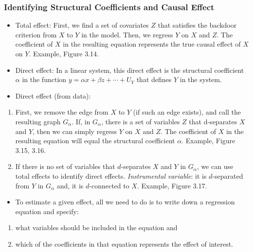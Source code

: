 \documentclass[]{article}
\providecommand{\tightlist}{%
  \setlength{\itemsep}{0pt}\setlength{\parskip}{0pt}}
\begin{document}
\subsubsection{Identifying Structural Coefficients and Causal
Effect}\label{identifying-structural-coefficients-and-causal-effect}

\begin{itemize}
\item
  Total effect: First, we find a set of covariates \(Z\) that satisfies
  the backdoor criterion from \(X\) to \(Y\) in the model. Then, we
  regress \(Y\) on \(X\) and \(Z\). The coefficient of \(X\) in the
  resulting equation represents the true causal effect of \(X\) on
  \(Y\). Example, Figure 3.14.
\item
  Direct effect: In a linear system, this direct effect is the
  structural coefficient \(\alpha\) in the function
  \(y = \alpha x + \beta z + \cdots + U_Y\) that defines \(Y\) in the
  system.
\item
  Direct effect (from data):
\end{itemize}

\begin{enumerate}
\def\labelenumi{\arabic{enumi}.}
\item
  First, we remove the edge from \(X\) to \(Y\) (if such an edge
  exists), and call the resulting graph \(G_\alpha\). If, in
  \(G_\alpha\), there is a set of variables \(Z\) that d-separates \(X\)
  and \(Y\), then we can simply regress \(Y\) on \(X\) and \(Z\). The
  coefficient of \(X\) in the resulting equation will equal the
  structural coefficient \(\alpha\). Example, Figure 3.15, 3.16.
\item
  If there is no set of variables that \(d\)-separates \(X\) and \(Y\)
  in \(G_\alpha\), we can use total effects to identify direct effects.
  \emph{Instrumental variable}: it is \(d\)-separated from \(Y\) in
  \(G_\alpha\) and, it is \(d\)-connected to \(X\). Example, Figure
  3.17.
\end{enumerate}

\begin{itemize}
\tightlist
\item
  To estimate a given effect, all we need to do is to write down a
  regression equation and specify:
\end{itemize}

\begin{enumerate}
\def\labelenumi{\arabic{enumi}.}
\tightlist
\item
  what variables should be included in the equation and
\item
  which of the coefficients in that equation represents the effect of
  interest.
\end{enumerate}
\end{document}
